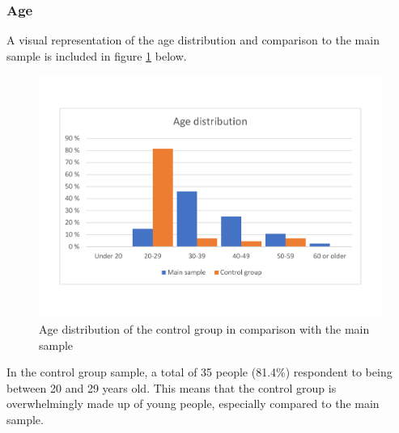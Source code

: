 \subsubsection{Age}
A visual representation of the age distribution and comparison to the main sample is included in figure \ref{fig:age_controlgroup} below. 
\begin{figure}[!h]
    \centering
    \includegraphics[scale=0.40]{figures/diagrams/age_controlgroup.pdf}
    \caption{Age distribution of the control group in comparison with the main sample}
    \label{fig:age_controlgroup}
\end{figure}
In the control group sample, a total of 35 people (81.4\%) respondent to being between 20 and 29 years old. This means that the control group is overwhelmingly made up of young people, especially compared to the main sample. 

